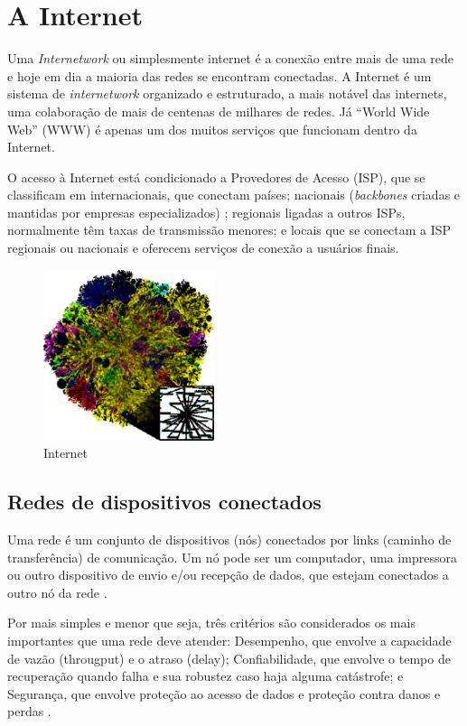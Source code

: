 \documentclass[conference,compsoc]{IEEEtran}
\begin{document}
\section{A Internet}

Uma \textit{Internetwork} ou simplesmente internet é a conexão entre mais de uma rede e hoje em dia a maioria das redes se encontram conectadas.  A Internet é um sistema de \textit{internetwork} organizado e estruturado, a mais notável das internets, uma colaboração de mais de centenas de milhares de redes. Já ``World Wide Web'' (WWW) é apenas um dos muitos serviços que funcionam dentro da Internet. 

O acesso à Internet está condicionado a Provedores de Acesso (ISP), que se classificam em internacionais, que conectam países; nacionais (\textit{backbones} criadas e mantidas por empresas especializados) ; regionais ligadas a outros ISPs, normalmente têm taxas de transmissão menores; e locais que se conectam a ISP regionais ou nacionais e oferecem serviços de conexão a usuários finais.


\begin{figure}[!h]
\centering
\caption{Internet}
\includegraphics[width=50mm]{Figuras/internet_map.eps}
\end{figure}



\subsection{Redes de dispositivos conectados}
Uma rede é um conjunto de dispositivos (nós) conectados por links (caminho de transferência) de comunicação.  Um nó pode ser um computador, uma impressora ou outro dispositivo de envio e/ou recepção de dados, que estejam conectados a outro nó da rede \cite{Forouzan}.

Por mais simples e menor que seja, três critérios são considerados os mais importantes que uma rede deve atender: Desempenho, que envolve a capacidade de vazão (througput) e o atraso (delay); Confiabilidade, que envolve o tempo de recuperação quando falha e sua robustez caso haja alguma catástrofe; e Segurança, que envolve proteção ao acesso de dados e proteção contra danos e perdas \cite{Forouzan} \cite{Specialski}.
\end{document}
